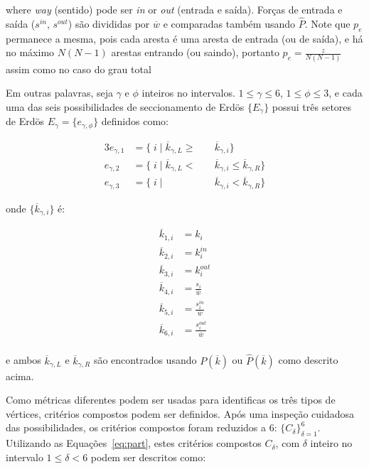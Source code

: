 \documentclass[a4paper,openright,12pt]{report} %
\begin{document}
\noindent where \emph{way} (sentido) pode ser \emph{in} or \emph{out} (entrada e saída).
Forças de entrada e saída ($s^{in}$, $s^{out}$)
são divididas por
$\overline{w}$
e comparadas também usando $\hat{P}$. Note que $p_e$ permanece a mesma,
pois cada aresta é uma aresta de entrada (ou de saída), e há no máximo $N(N-1)$
arestas entrando (ou saindo), portanto
$p_e=\frac{z}{N(N-1)}$
assim como no caso do grau total

Em outras palavras, seja $\gamma$ e $\phi$ inteiros no intervalos.
$1 \leq \gamma \leq 6$, $1 \leq \phi \leq 3$,
e cada uma das seis possibilidades de seccionamento de Erdös 
$\{E_{\gamma}\}$
possui três setores de Erdös
$E_{\gamma}= \{e_{\gamma, \phi} \}$
definidos como:

\begin{alignat}{3}\label{eq:part}
	e_{\gamma,1}&=\{\;i\;|\;\overline{k}_{\gamma,L}\geq&&\overline{k}_{\gamma,i}\} \nonumber \\
	e_{\gamma,2}&=\{\;i\;|\;\overline{k}_{\gamma,L}<\;&&\overline{k}_{\gamma,i}\leq\overline{k}_{\gamma,R}\} \\ 
	e_{\gamma,3}&=\{\;i\;|\;&&\overline{k}_{\gamma,i}<\overline{k}_{\gamma,R}\} \nonumber
\end{alignat}

\noindent onde $\{\overline{k}_{\gamma,i}\}$ é:

\begin{equation}
	\begin{split}
		\overline{k}_{1,i}&=k_i \\
		\overline{k}_{2,i}&=k_i^{in} \\
		\overline{k}_{3,i}&=k_i^{out} \\
		\overline{k}_{4,i}&=\frac{s_i}{\overline{w}} \\
		\overline{k}_{5,i}&=\frac{s_i^{in}}{\overline{w}} \\
		\overline{k}_{6,i}&=\frac{s_i^{out}}{\overline{w}} \\
	\end{split}
\end{equation}

\noindent e ambos $\overline{k}_{\gamma,L}$ e $\overline{k}_{\gamma,R}$ são encontrados  usando
$P(\overline{k})$ ou $\hat{P}(\overline{k})$
como descrito acima.

Como métricas diferentes podem ser usadas para identificas
os três tipos de vértices, critérios compostos podem ser
definidos. Após uma inspeção cuidadosa das possibilidades,
os critérios compostos foram reduzidos a 6: $\{C_\delta\}_{\delta=1}^{6}$.
Utilizando as Equações~\ref{eq:part}, estes critérios compostos $C_\delta$, com $\delta$ inteiro no intervalo $1\leq\delta<6$ podem ser descritos como:
\end{document}
